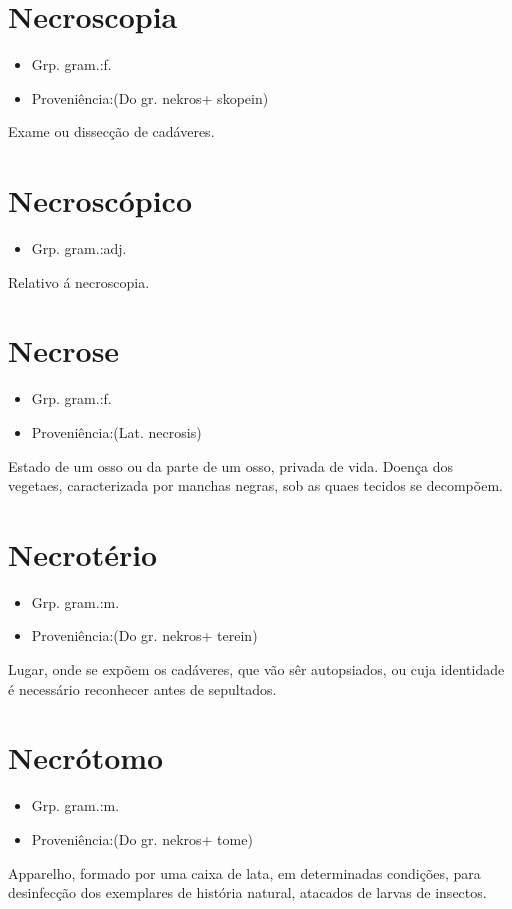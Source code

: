 \section{Necroscopia}
\begin{itemize}
\item {Grp. gram.:f.}
\end{itemize}
\begin{itemize}
\item {Proveniência:(Do gr. \textunderscore nekros\textunderscore  + \textunderscore skopein\textunderscore )}
\end{itemize}
Exame ou dissecção de cadáveres.
\section{Necroscópico}
\begin{itemize}
\item {Grp. gram.:adj.}
\end{itemize}
Relativo á necroscopia.
\section{Necrose}
\begin{itemize}
\item {Grp. gram.:f.}
\end{itemize}
\begin{itemize}
\item {Proveniência:(Lat. \textunderscore necrosis\textunderscore )}
\end{itemize}
Estado de um osso ou da parte de um osso, privada de vida.
Doença dos vegetaes, caracterizada por manchas negras, sob as quaes tecidos se decompõem.
\section{Necrotério}
\begin{itemize}
\item {Grp. gram.:m.}
\end{itemize}
\begin{itemize}
\item {Proveniência:(Do gr. \textunderscore nekros\textunderscore  + \textunderscore terein\textunderscore )}
\end{itemize}
Lugar, onde se expõem os cadáveres, que vão sêr autopsiados, ou cuja identidade é necessário reconhecer antes de sepultados.
\section{Necrótomo}
\begin{itemize}
\item {Grp. gram.:m.}
\end{itemize}
\begin{itemize}
\item {Proveniência:(Do gr. \textunderscore nekros\textunderscore  + \textunderscore tome\textunderscore )}
\end{itemize}
Apparelho, formado por uma caixa de lata, em determinadas condições, para desinfecção dos exemplares de história natural, atacados de larvas de insectos.
